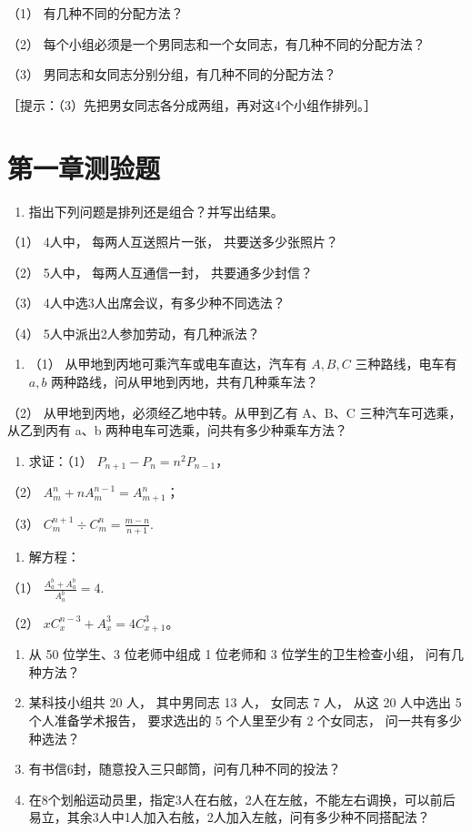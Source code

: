 （1） 有几种不同的分配方法？

（2） 每个小组必须是一个男同志和一个女同志，有几种不同的分配方法？

（3） 男同志和女同志分别分组，有几种不同的分配方法？

［提示：（3）先把男女同志各分成两组，再对这4个小组作排列。］

\section{第一章测验题}

\begin{enumerate}
\item
  指出下列问题是排列还是组合？并写出结果。
\end{enumerate}

（1） 4人中， 每两人互送照片一张， 共要送多少张照片？

（2） 5人中， 每两人互通信一封， 共要通多少封信？

（3） 4人中选3人出席会议，有多少种不同选法？

（4） 5人中派出2人参加劳动，有几种派法？

\begin{enumerate}[start=2]
\item
  （1） 从甲地到丙地可乘汽车或电车直达，汽车有 \(A, B, C\)
  三种路线，电车有 \(a, b\) 两种路线，问从甲地到丙地，共有几种乘车法？
\end{enumerate}

（2） 从甲地到丙地，必须经乙地中转。从甲到乙有 A、B、C
三种汽车可选乘，从乙到丙有 a、b 两种电车可选乘，问共有多少种乘车方法？

\begin{enumerate}[start=3]
\item
  求证：（1） \(P_{n+1} - P_n = n^2 P_{n-1}\)，
\end{enumerate}

（2） \(A_{m}^{n} + nA_{m}^{n - 1} = A_{m + 1}^{n}\)；

（3） \(C_{m}^{n + 1}\div C_{m}^{n} = \frac{m - n}{n + 1}.\)

\begin{enumerate}[start=4]
\item
  解方程：
\end{enumerate}

（1） \(\frac{A_{a}^{b} + A_{a}^{b}}{A_{a}^{b}} = 4.\)

（2） \(x C_{x}^{n - 3} + A_{x}^{3} = 4 C_{x + 1}^{3}\)。

\begin{enumerate}[start=5]
\item
  从 50 位学生、3 位老师中组成 1 位老师和 3 位学生的卫生检查小组，
  问有几种方法？
\item
  某科技小组共 20 人， 其中男同志 13 人， 女同志 7 人， 从这 20 人中选出
  5 个人准备学术报告， 要求选出的 5 个人里至少有 2 个女同志，
  问一共有多少种选法？
\item
  有书信6封，随意投入三只邮筒，问有几种不同的投法？
\item
  在8个划船运动员里，指定3人在右舷，2人在左舷，不能左右调换，可以前后易立，其余3人中1人加入右舷，2人加入左舷，问有多少种不同搭配法？
\end{enumerate}

